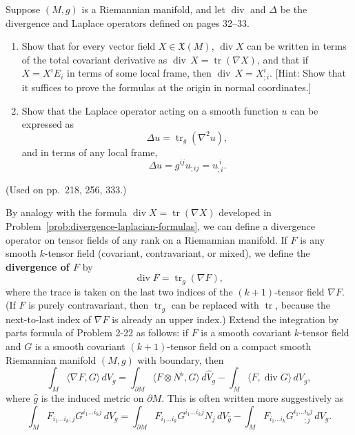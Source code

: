 \begin{exercise}
\label{prob:divergence-laplacian-formulas}

Suppose $(M,g)$ is a Riemannian manifold, and let $\operatorname{div}$ and $\Delta$ be the divergence and Laplace operators defined on pages 32--33.
\begin{enumerate}
\item[(a)] Show that for every vector field $X \in \mathfrak{X}(M)$, $\operatorname{div} X$ can be written in terms of the total covariant derivative as $\operatorname{div}\, X = \operatorname{tr}(\nabla X)$, and that if $X = X^i E_i$ in terms of some local frame, then $\operatorname{div}\, X = X^i_{;i}$. [Hint: Show that it suffices to prove the formulas at the origin in normal coordinates.]
\item[(b)] Show that the Laplace operator acting on a smooth function $u$ can be expressed as
\[
\Delta u = \operatorname{tr}_g(\nabla^2 u),
\]
and in terms of any local frame,
\[
\Delta u = g^{ij}u_{;ij} = u_{;i}^{\ i}.
\]
\end{enumerate}
(Used on pp.\ 218, 256, 333.)
\end{exercise}

\begin{exercise}
\label{prob:divergence-tensor-fields}

By analogy with the formula $\operatorname{div} X = \operatorname{tr}(\nabla X)$ developed in Problem~\ref{prob:divergence-laplacian-formulas}, we can define a divergence operator on tensor fields of any rank on a Riemannian manifold. If $F$ is any smooth $k$-tensor field (covariant, contravariant, or mixed), we define the \textbf{divergence of $F$} by
\[
\operatorname{div} F = \operatorname{tr}_g(\nabla F),
\]
where the trace is taken on the last two indices of the $(k+1)$-tensor field $\nabla F$. (If $F$ is purely contravariant, then $\operatorname{tr}_g$ can be replaced with $\operatorname{tr}$, because the next-to-last index of $\nabla F$ is already an upper index.) Extend the integration by parts formula of Problem 2-22 as follows: if $F$ is a smooth covariant $k$-tensor field and $G$ is a smooth covariant $(k+1)$-tensor field on a compact smooth Riemannian manifold $(M,g)$ with boundary, then
\[
\int_M \langle \nabla F, G \rangle \, dV_g = \int_{\partial M} \langle F \otimes N^\flat, G \rangle \, d\hat{V}_g - \int_M \langle F, \operatorname{div} G \rangle \, dV_g,
\]
where $\hat{g}$ is the induced metric on $\partial M$. This is often written more suggestively as
\[
\int_M F_{i_1 \ldots i_k ; j} G^{i_1 \ldots i_k j} \, dV_g = \int_{\partial M} F_{i_1 \ldots i_k} G^{i_1 \ldots i_k j} N_j \, dV_{\hat{g}} - \int_M F_{i_1 \ldots i_k} G^{i_1 \ldots i_k j}_{\ \ \ \ \ \ \ ;j} \, dV_g.
\]
\end{exercise}

